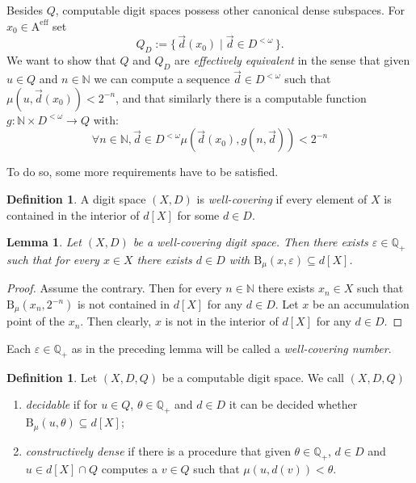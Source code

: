 \documentclass[microtype]{jloganal}
\theoremstyle{plain}
\newtheorem{lemma}[theorem]{Lemma}
\theoremstyle{definition}
\newtheorem{definition}[theorem]{Definition}
\newcommand{\NN}{\mathbb{N}}
\newcommand{\QQ}{\mathbb{Q}}
\newcommand{\ball}[3]{\mathrm{B}_{#1}(#2,#3)}
\newcommand{\set}[2]{\mbox{$\{\,#1 \mid #2 \,\}$}}
\newcommand{\fun}[3]{\mbox{$#1 \colon #2 \rightarrow #3$}}
\newcommand{\cauchy}{\mathrm{A}}
\begin{document}
Besides $Q$, computable digit spaces possess other canonical dense subspaces. For $x_0 \in \cauchy^\text{eff}$ set
\[
Q_D := \set{\vec d(x_0)}{\vec d \in D^{< \omega}}.
\] 
We want to show that $Q$ and $Q_D$ are \emph{effectively equivalent} in the sense that given $u \in Q$ and $n \in \NN$ we can compute a sequence $\vec d \in D^{<\omega}$ such that $\mu(u, \vec d(x_0)) < 2^{-n}$, and that similarly there is a computable function $\fun{g}{\NN \times D^{< \omega}}{Q}$ with:
\[
\forall n \in \NN, \vec d \in D^{<\omega}  \mu(\vec{d}(x_0), g(n,\vec{d})) < 2^{-n}
\]

To do so, some more requirements have to be satisfied.

\begin{definition}
\label{def-well-covering}
A digit space $(X,D)$ is \emph{well-covering} if every element of $X$ is
contained in the interior of $d[X]$ for some $d\in D$.
\end{definition}
\begin{lemma}
\label{lem-well-covering}
Let $(X,D)$ be a well-covering digit space. Then there exists 
$\varepsilon \in \QQ_+$ such that for every $x\in X$ there exists $d\in D$ with
$\ball{\mu}{x}{\varepsilon}\subseteq d[X]$. 
\end{lemma}
\begin{proof}
Assume the contrary. Then for every $n\in\NN$ there exists $x_n\in X$ such
that $\ball{\mu}{x_n}{2^{-n}}$ is not contained in $d[X]$ for any $d\in D$.
Let $x$ be an accumulation point of the $x_n$. Then clearly, $x$ is not in the 
interior of $d[X]$ for any $d\in D$.
\end{proof}

Each $\varepsilon \in \QQ_+$ as in the preceding lemma will be called a \emph{well-covering number}. 

\begin{definition}
\label{def-deceffdense}
Let $(X, D, Q)$ be a computable digit space. We call $(X, D, Q)$
\begin{enumerate}
\item\label{def-deceffdense-1}  \emph{decidable} if for $u \in Q$, $\theta \in \QQ_+$ and $d \in D$ it can be decided whether $\ball{\mu}{u}{\theta} \subseteq d[X]$;

\item\label{def-deceffdense-2} \emph{constructively dense} if there is a procedure that given $\theta \in \QQ_+$, $d \in D$ and $u \in d[X] \cap Q$ computes a $v \in Q$ such that $\mu(u, d(v)) < \theta$.

\end{enumerate}
\end{definition}
\end{document}
